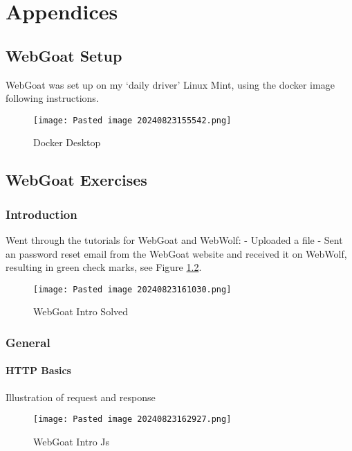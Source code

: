 \documentclass[
	letterpaper, %
	10pt, %
	unnumberedsections, %
	twoside, %
]{APAAssignment}
\begin{document}
\chapter{Appendices}
\begin{appendices}


\section{WebGoat Setup}\label{app:webgoat-setup}

WebGoat was set up on my `daily driver' Linux Mint, using the docker
image following instructions.

\begin{figure}[!ht] %
	\texttt{[image: Pasted image 20240823155542.png]}
	\caption{Docker Desktop}
	\label{fig:Docker-Desktop}
\end{figure}

\section{WebGoat Exercises}\label{app:webgoat-exercises}

\subsection{Introduction}\label{app:introduction}
Went through the tutorials for WebGoat and WebWolf: - Uploaded a file -
Sent an password reset email from the WebGoat website and received it on
WebWolf, resulting in green check marks, see Figure \ref{fig:WebGoatIntro}. 

\begin{figure}[!ht] %
	\centering
	\texttt{[image: Pasted image 20240823161030.png]}
	\caption{WebGoat Intro Solved}
	\label{fig:WebGoatIntro}
\end{figure}


\subsection{General}\label{app:general}
\subsubsection{HTTP Basics}

Illustration of request and response 

\begin{figure}[!ht] %
	\centering
	\texttt{[image: Pasted image 20240823162927.png]}
	\caption{WebGoat Intro Js}
	\label{fig:Intro Js}
\end{figure}



\end{appendices}
\end{document}
